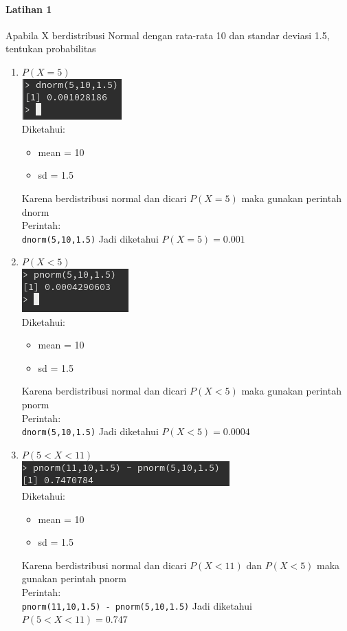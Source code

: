 \documentclass[a4paper,12pt]{article}
\begin{document}
\paragraph{Latihan 1\\}
Apabila X berdistribusi Normal dengan rata-rata 10 dan standar deviasi 1.5, tentukan probabilitas
\begin{enumerate}[label=\alph*.]
    \item $P(X = 5)$\\
        \includegraphics{lat1a}\\
        Diketahui:
        \begin{itemize}
            \item mean = 10
            \item sd = 1.5
        \end{itemize}
        Karena berdistribusi normal dan dicari $P(X = 5)$ maka gunakan perintah dnorm\\  
        Perintah:\\
        \texttt{dnorm(5,10,1.5)}
        Jadi diketahui $P(X = 5) = 0.001$

    \item $P(X < 5)$\\
        \includegraphics{lat1b}\\
        Diketahui:
        \begin{itemize}
            \item mean = 10
            \item sd = 1.5
        \end{itemize}
        Karena berdistribusi normal dan dicari $P(X < 5)$ maka gunakan perintah pnorm\\  
        Perintah:\\
        \texttt{dnorm(5,10,1.5)}
        Jadi diketahui $P(X < 5) = 0.0004$

    \item $P(5 < X < 11)$\\
        \includegraphics{lat1c}\\
        Diketahui:
        \begin{itemize}
            \item mean = 10
            \item sd = 1.5
        \end{itemize}
        Karena berdistribusi normal dan dicari $P(X < 11)$ dan $P(X < 5)$ maka gunakan perintah pnorm\\  
        Perintah:\\
        \texttt{pnorm(11,10,1.5) - pnorm(5,10,1.5)}
        Jadi diketahui $P(5 < X < 11) = 0.747$


\end{enumerate}
\end{document}
